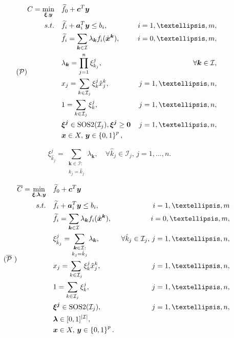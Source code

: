 \documentclass[10pt,a4paper]{amsart}
\begin{document}
\begin{equation}\label{eq:minlp}\tag{$\mathcal{P}$}
\begin{aligned}
    C = \min_{\bm{\xi},\bm{y}} \quad & \widetilde{f}_0 + \bm{c}^{T} \bm{y}  \\
    \textrm{s.t.} \quad & \widetilde{f}_i + \bm{a}_i^{T} \bm{y} \le b_i, & i=1,\ldots,m, \\
			& \widetilde{f}_i = \sum_{\bm{k}\in\mathcal{I}} \lambda_{\bm{k}}  f_i(\hat{\bm{x}}^{\bm{k}}), & i=0,\ldots,m, \\
   &\lambda_{\bm{k}} = \prod_{j=1}^{n} \xi^j_{k_j}, &
     \forall \bm{k}\in\mathcal{I}, \\
   &x_{j} = \sum_{k\in\mathcal{I}_j} \xi^j_{k} \hat{x}_{j}^{k}, &j=1,\ldots,n, \\
   &1 = \sum_{k\in\mathcal{I}_j} \xi^j_{k}, &j=1,\ldots,n, \\
      & \bm{\xi^j} \in \text{SOS2}(\mathcal{I}_j), \bm{\xi^j}\geq \mathbf{0} & j=1,\ldots,n, \\
      & \bm{x}\in X, \,\bm{y}\in \left\{ 0,1 \right\}^{p}
,\end{aligned}
\end{equation}

\begin{equation}\label{eq:relaxed-interpolation-bilinears}
     \xi^j_{\hat{k}_j} = \sum_{\substack{\bm{k} \in \mathcal{I}: \\ k_j = \hat{k}_j}} \lambda_{\bm{k}},\quad \forall \hat{k}_j\in \mathcal{I}_j,\, j=1,\ldots,n .
\end{equation}

\begin{equation}\label{eq:milp}\tag{$\overline{\mathcal{P}}$ }
\begin{aligned}
    \overline{C} = \min_{\bm{\xi},\bm{\lambda},\bm{y}} \quad & \widetilde{f}_0 + \bm{c}^{T} \bm{y}  \\
    \textrm{s.t.} \quad & \widetilde{f}_i + \bm{a}_i^{T} \bm{y} \le b_i, & i=1,\ldots,m \\
			& \widetilde{f}_i = \sum_{\bm{k}\in\mathcal{I}} \lambda_{\bm{k}}  f_i(\hat{\bm{x}}^{\bm{k}}), & i=0,\ldots,m, \\
        &\xi^j_{\hat{k}_j} = \sum_{\substack{\bm{k} \in \mathcal{I}: \\ k_j = \hat{k}_j}} \lambda_{\bm{k}},& \forall \hat{k}_j\in \mathcal{I}_j,\, j=1,\ldots,n, \\
   &x_{j} = \sum_{k\in\mathcal{I}_j} \xi^j_{k} \hat{x}_{j}^{k}, &j=1,\ldots,n, \\
   &1 = \sum_{k\in\mathcal{I}_j} \xi^j_{k}, &j=1,\ldots,n, \\
      & \bm{\xi^j} \in \text{SOS2}(\mathcal{I}_j), & j=1,\ldots,n, \\
      & \bm{\lambda} \in [0,1]^{|\mathcal{I}|}, \\
      & \bm{x}\in X, \,\bm{y}\in \left\{ 0,1 \right\}^{p} 
.\end{aligned}
\end{equation}
\end{document}
